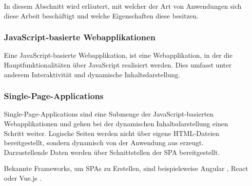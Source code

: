 

In diesem Abschnitt wird erläutert, mit welcher der Art von Anwendungen sich diese Arbeit beschäftigt und welche Eigenschaften diese besitzen.

\subsubsection{JavaScript-basierte Webapplikationen}

Eine JavaScript-basierte Webapplikation, ist eine Webapplikation, in der die Hauptfunktionalitäten über JavaScript realisiert werden. Dies umfasst unter anderem Interaktivität und dynamische Inhaltsdarstellung.

\subsubsection{Single-Page-Applications}

Single-Page-Applications sind eine Submenge der JavaScript-basierten Webapplikationen und gehen bei der dynamischen Inhaltsdarstellung einen Schritt weiter. Logische Seiten werden nicht über eigene HTML-Dateien bereitgestellt, sondern dynamisch von der Anwendung aus erzeugt. Darzustellende Daten werden über Schnittstellen der SPA bereitgestellt.

Bekannte Frameworks, um SPAs zu Erstellen, sind beispielsweise Angular \cite{AngularHomepage}, React \cite{ReactHomepage} oder Vue.js \cite{VueJSHomepage}.